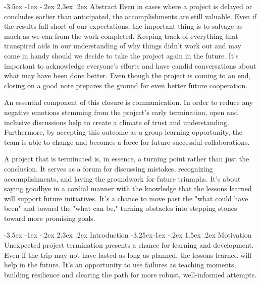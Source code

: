 \documentclass[11pt]{article}
\makeatletter
\renewcommand\section{\@startsection {section}{1}{\z@}%
                                       {-3.5ex \@plus -1ex \@minus -.2ex}%
                                       {2.3ex \@plus.2ex}%
                                       {\normalfont\fontfamily{phv}\fontsize{14}{17}\bfseries}}
\renewcommand\subsection{\@startsection{subsection}{2}{\z@}%
                                         {-3.25ex\@plus -1ex \@minus -.2ex}%
                                         {1.5ex \@plus .2ex}%
                                         {\normalfont\fontfamily{phv}\fontsize{11}{14}\bfseries}}
\makeatother
\begin{document}
{\pagebreak
\tableofcontents
\newpage
    
    
\section{Abstract} 
        Even in cases where a project is delayed or concludes earlier than anticipated, the accomplishments are still valuable. Even if the results fall short of our expectations, the important thing is to salvage as much as we can from the work completed. Keeping track of everything that transpired aids in our understanding of why things didn't work out and may come in handy should we decide to take the project again in the future. It's important to acknowledge everyone's efforts and have candid conversations about what may have been done better. Even though the project is coming to an end, closing on a good note prepares the ground for even better future cooperation.

        An essential component of this closure is communication. In order to reduce any negative emotions stemming from the project's early termination, open and inclusive discussions help to create a climate of trust and understanding. Furthermore, by accepting this outcome as a group learning opportunity, the team is able to change and becomes a force for future successful collaborations.
        
        A project that is terminated is, in essence, a turning point rather than just the conclusion. It serves as a forum for discussing mistakes, recognizing accomplishments, and laying the groundwork for future triumphs. It's about saying goodbye in a cordial manner with the knowledge that the lessons learned will support future initiatives. It's a chance to move past the "what could have been" and toward the "what can be," turning obstacles into stepping stones toward more promising goals. 
    
\section{Introduction}
        \subsection{Motivation}
            Unexpected project termination presents a chance for learning and development. Even if the trip may not have lasted as long as planned, the lessons learned will help in the future. It's an opportunity to use failures as teaching moments, building resilience and clearing the path for more robust, well-informed attempts.
}
\end{document}
